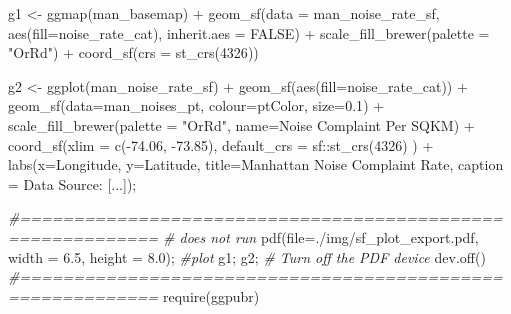\documentclass[
  11pt,
]{book}
\newenvironment{Shaded}{\begin{snugshade}}{\end{snugshade}}
\newcommand{\AttributeTok}[1]{\textcolor[rgb]{0.77,0.63,0.00}{#1}}
\newcommand{\CommentTok}[1]{\textcolor[rgb]{0.56,0.35,0.01}{\textit{#1}}}
\newcommand{\ConstantTok}[1]{\textcolor[rgb]{0.00,0.00,0.00}{#1}}
\newcommand{\DecValTok}[1]{\textcolor[rgb]{0.00,0.00,0.81}{#1}}
\newcommand{\FloatTok}[1]{\textcolor[rgb]{0.00,0.00,0.81}{#1}}
\newcommand{\FunctionTok}[1]{\textcolor[rgb]{0.00,0.00,0.00}{#1}}
\newcommand{\NormalTok}[1]{#1}
\newcommand{\OtherTok}[1]{\textcolor[rgb]{0.56,0.35,0.01}{#1}}
\newcommand{\SpecialCharTok}[1]{\textcolor[rgb]{0.00,0.00,0.00}{#1}}
\newcommand{\StringTok}[1]{\textcolor[rgb]{0.31,0.60,0.02}{#1}}
\begin{document}
\begin{Shaded}
\begin{Highlighting}[]
\NormalTok{g1 }\OtherTok{\textless{}{-}} \FunctionTok{ggmap}\NormalTok{(man\_basemap) }\SpecialCharTok{+}
    \FunctionTok{geom\_sf}\NormalTok{(}\AttributeTok{data =}\NormalTok{ man\_noise\_rate\_sf, }\FunctionTok{aes}\NormalTok{(}\AttributeTok{fill=}\NormalTok{noise\_rate\_cat), }\AttributeTok{inherit.aes =} \ConstantTok{FALSE}\NormalTok{) }\SpecialCharTok{+}
    \FunctionTok{scale\_fill\_brewer}\NormalTok{(}\AttributeTok{palette =} \StringTok{"OrRd"}\NormalTok{) }\SpecialCharTok{+}
    \FunctionTok{coord\_sf}\NormalTok{(}\AttributeTok{crs =} \FunctionTok{st\_crs}\NormalTok{(}\DecValTok{4326}\NormalTok{))}

\NormalTok{g2 }\OtherTok{\textless{}{-}} \FunctionTok{ggplot}\NormalTok{(man\_noise\_rate\_sf) }\SpecialCharTok{+} 
  \FunctionTok{geom\_sf}\NormalTok{(}\FunctionTok{aes}\NormalTok{(}\AttributeTok{fill=}\NormalTok{noise\_rate\_cat)) }\SpecialCharTok{+}
  \FunctionTok{geom\_sf}\NormalTok{(}\AttributeTok{data=}\NormalTok{man\_noises\_pt, }\AttributeTok{colour=}\NormalTok{ptColor, }\AttributeTok{size=}\FloatTok{0.1}\NormalTok{) }\SpecialCharTok{+}
  \FunctionTok{scale\_fill\_brewer}\NormalTok{(}\AttributeTok{palette =} \StringTok{"OrRd"}\NormalTok{, }\AttributeTok{name=}\StringTok{\textquotesingle{}Noise Complaint Per SQKM\textquotesingle{}}\NormalTok{) }\SpecialCharTok{+}
  \FunctionTok{coord\_sf}\NormalTok{(}\AttributeTok{xlim =} \FunctionTok{c}\NormalTok{(}\SpecialCharTok{{-}}\FloatTok{74.06}\NormalTok{, }\SpecialCharTok{{-}}\FloatTok{73.85}\NormalTok{), }\AttributeTok{default\_crs =}\NormalTok{ sf}\SpecialCharTok{::}\FunctionTok{st\_crs}\NormalTok{(}\DecValTok{4326}\NormalTok{) ) }\SpecialCharTok{+}
  \FunctionTok{labs}\NormalTok{(}\AttributeTok{x=}\StringTok{\textquotesingle{}Longitude\textquotesingle{}}\NormalTok{, }\AttributeTok{y=}\StringTok{\textquotesingle{}Latitude\textquotesingle{}}\NormalTok{, }
       \AttributeTok{title=}\StringTok{\textquotesingle{}Manhattan Noise Complaint Rate\textquotesingle{}}\NormalTok{,}
       \AttributeTok{caption =} \StringTok{\textquotesingle{}Data Source: [...]\textquotesingle{}}\NormalTok{);}

\CommentTok{\#===========================================================}
\CommentTok{\# does not run}
\FunctionTok{pdf}\NormalTok{(}\AttributeTok{file=}\StringTok{\textquotesingle{}./img/sf\_plot\_export.pdf\textquotesingle{}}\NormalTok{, }\AttributeTok{width =} \FloatTok{6.5}\NormalTok{, }\AttributeTok{height =} \FloatTok{8.0}\NormalTok{);}
\CommentTok{\#plot}
\NormalTok{g1; g2;}
\CommentTok{\# Turn off the PDF device}
\FunctionTok{dev.off}\NormalTok{()}
\CommentTok{\#===========================================================}
\FunctionTok{require}\NormalTok{(ggpubr)}


\end{Highlighting}
\end{Shaded}
\end{document}

